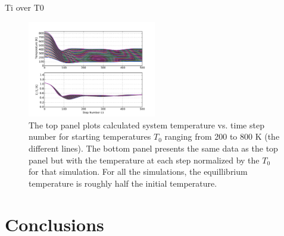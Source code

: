 \documentclass[10pt,showpacs,preprintnumbers,footinbib,amsmath,amssymb,aps,prl,twocolumn,groupedaddress,superscriptaddress,showkeys]{revtex4-1}
\begin{document}
Ti over T0

\begin{figure}
\centering
	\includegraphics[width=0.5\textwidth]{figures/TempSteps.pdf}
	\caption{The top panel plots calculated system temperature vs.
	time step
	number for starting temperatures $T_0$ ranging from 200 to 800
	K (the different lines). The bottom panel presents the same data
	as the top panel but with the temperature at each step normalized
	by the $T_0$ for that simulation. For all the simulations, the
	equillibrium temperature is roughly half the initial temperature.}
	\label{fig:tempsteps}
\end{figure}








\section{Conclusions}





\end{document}

